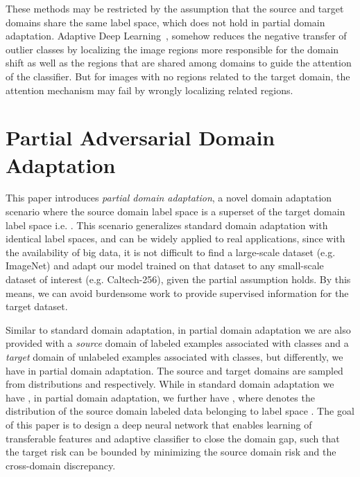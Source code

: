 \documentclass[runningheads]{llncs}
\begin{document}
These methods may be restricted by the assumption that the source and target domains share the same label space, which does not hold in partial domain adaptation. Adaptive Deep Learning~\cite{cite:ICRA18LoAd}, somehow reduces the negative transfer of outlier classes by localizing the image regions more responsible for the domain shift as well as the regions that are shared among domains to guide the attention of the classifier. But for images with no regions related to the target domain, the attention mechanism may fail by wrongly localizing related regions. 

\section{Partial Adversarial Domain Adaptation}
This paper introduces \emph{partial domain adaptation}, a novel domain adaptation scenario where the source domain label space  is a superset of the target domain label space  i.e. . This scenario generalizes standard domain adaptation with identical label spaces, and can be widely applied to real applications, since with the availability of big data, it is not difficult to find a large-scale dataset (e.g. ImageNet) and adapt our model trained on that dataset to any small-scale dataset of interest (e.g. Caltech-256), given the partial assumption holds. By this means, we can avoid burdensome work to provide supervised information for the target dataset.

Similar to standard domain adaptation, in partial domain adaptation we are also provided with a \emph{source} domain  of  labeled examples associated with  classes and a \emph{target} domain  of  unlabeled examples associated with  classes, but differently, we have  in partial domain adaptation. The source and target domains are sampled from distributions  and  respectively. While in standard domain adaptation we have , in partial domain adaptation, we further have , where  denotes the distribution of the source domain labeled data belonging to label space .
The goal of this paper is to design a deep neural network that enables learning of transferable features  and adaptive classifier  to close the domain gap, such that the target risk  can be bounded by minimizing the source domain risk and the cross-domain discrepancy.
\end{document}
